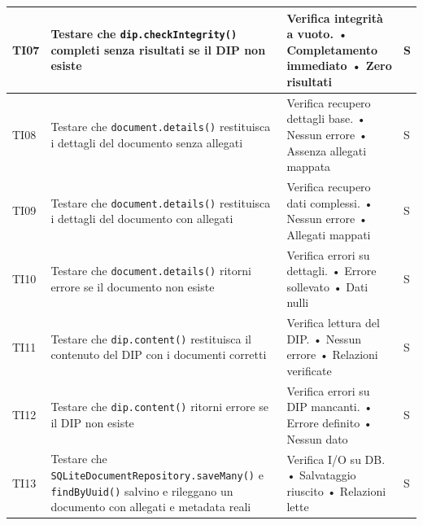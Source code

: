 \documentclass[a4paper,12pt]{article}
\begin{document}
\begin{longtable}{|M{1.2cm}|M{6.3cm}|M{5cm}|M{1.5cm}|}
            TI07 & Testare che \texttt{dip.checkIntegrity()} completi senza risultati se il DIP non esiste & Verifica integrità a vuoto. \newline • Completamento immediato \newline • Zero risultati & S \\ \hline
            
            TI08 & Testare che \texttt{document.details()} restituisca i dettagli del documento senza allegati & Verifica recupero dettagli base. \newline • Nessun errore \newline • Assenza allegati mappata & S \\ \hline
            
            TI09 & Testare che \texttt{document.details()} restituisca i dettagli del documento con allegati & Verifica recupero dati complessi. \newline • Nessun errore \newline • Allegati mappati & S \\ \hline
            
            TI10 & Testare che \texttt{document.details()} ritorni errore se il documento non esiste & Verifica errori su dettagli. \newline • Errore sollevato \newline • Dati nulli & S \\ \hline
            
            TI11 & Testare che \texttt{dip.content()} restituisca il contenuto del DIP con i documenti corretti & Verifica lettura del DIP. \newline • Nessun errore \newline • Relazioni verificate & S \\ \hline
            
            TI12 & Testare che \texttt{dip.content()} ritorni errore se il DIP non esiste & Verifica errori su DIP mancanti. \newline • Errore definito \newline • Nessun dato & S \\ \hline
            
            TI13 & Testare che \texttt{SQLiteDocumentRepository.saveMany()} e \texttt{findByUuid()} salvino e rileggano un documento con allegati e metadata reali & Verifica I/O su DB. \newline • Salvataggio riuscito \newline • Relazioni lette & S \\ \hline
            

\end{longtable}
\end{document}
